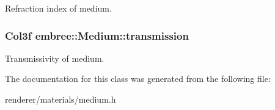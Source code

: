 Refraction index of medium. 

\hypertarget{classembree_1_1_medium_a4adaa3f000afbe7bf57fb61764dbcb87}{
\subsubsection[{transmission}]{\setlength{\rightskip}{0pt plus 5cm}Col3f {\bf embree::Medium::transmission}}}
\label{classembree_1_1_medium_a4adaa3f000afbe7bf57fb61764dbcb87}


Transmissivity of medium. 



The documentation for this class was generated from the following file:\begin{DoxyCompactItemize}
\item 
renderer/materials/medium.h\end{DoxyCompactItemize}
